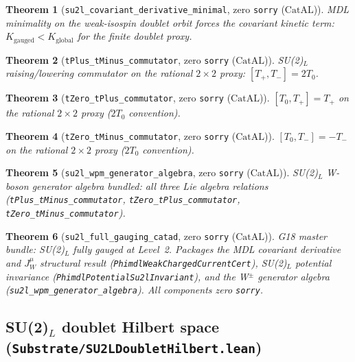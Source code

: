 \documentclass[11pt,a4paper]{article}
\newtheorem{theorem}{Theorem}[section]
\theoremstyle{definition}
\newcommand{\CatAL}{\ensuremath{\mathrm{CatAL}}}
\begin{document}
\begin{theorem}[\lstinline|su2l_covariant_derivative_minimal|, zero \texttt{sorry} ($\CatAL$)]
MDL minimality on the weak-isospin doublet orbit forces the covariant kinetic term:
$K_{\mathrm{gauged}}<K_{\mathrm{global}}$ for the finite doublet proxy.
\end{theorem}

\begin{theorem}[\lstinline|tPlus_tMinus_commutator|, zero \texttt{sorry} ($\CatAL$)]
SU(2)$_L$ raising/lowering commutator on the rational $2\times2$ proxy:
$[T_+,T_-]=2T_0$.
\end{theorem}

\begin{theorem}[\lstinline|tZero_tPlus_commutator|, zero \texttt{sorry} ($\CatAL$)]
$[T_0,T_+]=T_+$ on the rational $2\times2$ proxy ($2T_0$ convention).
\end{theorem}

\begin{theorem}[\lstinline|tZero_tMinus_commutator|, zero \texttt{sorry} ($\CatAL$)]
$[T_0,T_-]=-T_-$ on the rational $2\times2$ proxy ($2T_0$ convention).
\end{theorem}

\begin{theorem}[\lstinline|su2l_wpm_generator_algebra|, zero \texttt{sorry} ($\CatAL$)]
SU(2)$_L$ W-boson generator algebra bundled: all three Lie algebra relations
(\lstinline|tPlus_tMinus_commutator|, \lstinline|tZero_tPlus_commutator|,
\lstinline|tZero_tMinus_commutator|).
\end{theorem}

\begin{theorem}[\lstinline|su2l_full_gauging_catad|, zero \texttt{sorry} ($\CatAL$)]
\label{thm:su2l-full-gauging-catad}
G18 master bundle: SU(2)$_L$ fully gauged at Level~2.
Packages the MDL covariant derivative and $J^\mu_W$ structural result
(\lstinline|PhimdlWeakChargedCurrentCert|), SU(2)$_L$ potential invariance
(\lstinline|PhimdlPotentialSu2lInvariant|), and the W$^\pm$ generator algebra
(\lstinline|su2l_wpm_generator_algebra|). All components zero \texttt{sorry}.
\end{theorem}

\subsection{SU(2)$_L$ doublet Hilbert space
  (\texttt{Substrate/SU2LDoubletHilbert.lean})}\label{subsec:su2l-doublet-hilbert}
\end{document}
